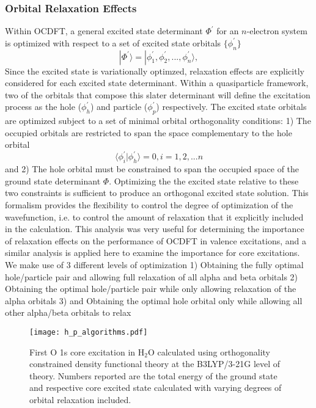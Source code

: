 \documentclass{article}
\begin{document}
\subsubsection{Orbital Relaxation Effects}
Within OCDFT, a general excited state determinant $\Phi^{\prime}$ for an $n$-electron system is optimized with respect to a set of excited state orbitals $\{\phi_n^{\prime}\}$ 
\begin{equation}
|\Phi^{\prime} \rangle = | \phi^{\prime}_1, \phi^{\prime}_2, ..., \phi^{\prime}_n \rangle,
\end{equation}
Since the excited state is variationally optimzed, relaxation effects are explicitly considered for each excited state determinant. Within a quasiparticle framework, two of the orbitals that compose this slater determinant will define the excitation process as the hole ($\phi^{\prime}_h$) and particle ($\phi^{\prime}_p$) respectively. The excited state orbitals are optimized subject to a set of minimal orbital orthogonality conditions: 1) The occupied orbitals are restricted to span the space complementary to the hole orbital 
\begin{equation}
\langle \phi^{\prime}_i|\phi_h^{\prime}\rangle = 0, i=1,2,...n
\end{equation}
and 2) The hole orbital must be constrained to span the occupied space of the ground state determinant $\Phi$. Optimizing the the excited state relative to these two constraints is sufficient to produce an orthogonal excited state solution. This formalism provides the flexibility to control the degree of optimization of the wavefunction, i.e. to control the amount of relaxation that it explicitly included in the calculation. This analysis was very useful for determining the importance of relaxation effects on the performance of OCDFT in valence excitations, \cite{evangelista_orthogonality_2013} and a similar analysis is applied here to examine the importance for core excitations. We make use of 3 different levels of optimization 1) Obtaining the fully optimal hole/particle pair and allowing full relaxation of all alpha and beta orbitals 2) Obtaining the optimal hole/particle pair while only allowing relaxation of the alpha orbitals 3) and Obtaining the optimal hole orbital only while allowing all other alpha/beta orbitals to relax
\begin{figure}
\centering
\texttt{[image: h\_p\_algorithms.pdf]}
\caption{First O 1s core excitation in H$_2$O calculated using orthogonality constrained density functional theory at the B3LYP/3-21G level of theory. Numbers reported are the total energy of the ground state and respective core excited state calculated with varying degrees of orbital relaxation included.}
\label{fig:relax}
\end{figure}
\end{document}
